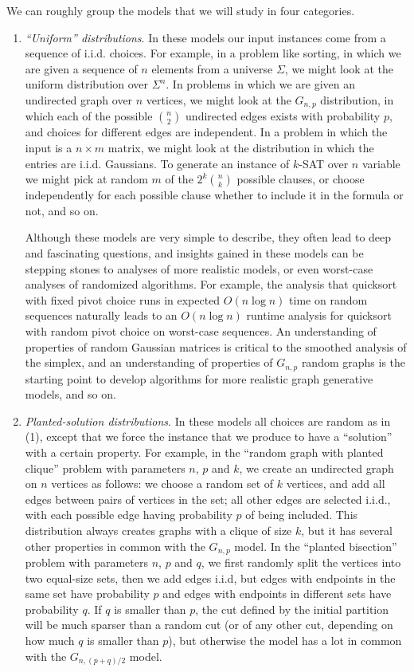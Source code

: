 We can roughly group the models that we will study in four categories.

\begin{enumerate}

\item {\em ``Uniform'' distributions}.  In these models our input instances come from a sequence of i.i.d. choices. For example, in a problem like sorting, in which we are given a sequence of $n$ elements from a universe $\Sigma$, we might look at the uniform distribution over $\Sigma^n$. In problems in which we are given an undirected graph over $n$ vertices, we might look at the $G_{n,p}$ distribution, in which each of the possible ${n \choose 2}$ undirected edges exists with probability $p$, and choices for different edges are independent. In a problem in which the input is a $n \times m$ matrix, we might look at the distribution in which the entries are i.i.d. Gaussians. To generate an instance of $k$-SAT over $n$ variable we might pick at random $m$ of the $2^k {n \choose k}$ possible clauses, or choose independently for each possible clause whether to include it in the formula or not, and so on.

Although these models are very simple to describe, they often lead to deep and fascinating questions, and insights gained in these models can be  stepping stones to analyses of more realistic models, or even worst-case analyses of randomized algorithms. For example, the analysis that quicksort with fixed pivot choice runs in expected $O(n \log n)$ time on random sequences naturally leads 
to an $O(n \log n)$ runtime analysis for quicksort with random pivot choice on worst-case sequences. An understanding of properties of random Gaussian matrices is critical to the smoothed analysis of the simplex, and an understanding of properties of $G_{n,p}$ random graphs is the starting point to develop algorithms for more realistic graph generative models, and so on.

\item {\em Planted-solution distributions}. In these models all choices are random as in (1), except that we force the instance that we produce to have a ``solution'' with a certain property. For example, in the ``random graph with planted clique'' problem with parameters $n$, $p$ and $k$, we create an undirected  graph on $n$ vertices as follows: we choose a random set of $k$ vertices, and add all edges between pairs of vertices in the set; all other edges are selected i.i.d., with each possible edge having probability $p$ of being included. This distribution always creates graphs with a clique of size $k$, but it has several other properties in common with the $G_{n,p}$ model. In the ``planted bisection'' problem with parameters $n$, $p$ and $q$, we first randomly split the vertices into two equal-size sets, then we add edges i.i.d, but edges with endpoints in the same set have probability $p$ and edges with endpoints in different sets have probability $q$. If $q$ is  smaller than $p$, the cut defined by the initial partition will be much sparser than a random cut (or of any other cut, depending on how much $q$ is smaller than $p$), but otherwise the model has a lot in common with the
$G_{n, (p+q)/2}$ model. 


\end{enumerate}
